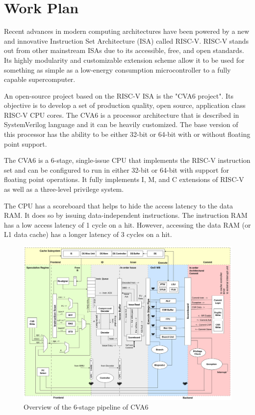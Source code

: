 \chapter{Work Plan}
\label{chapter:work_plan}

Recent advances in modern computing architectures have been powered by a new and innovative Instruction Set Architecture (ISA) called RISC-V. RISC-V stands out from other mainstream ISAs due to its accessible, free, and open standards. Its highly modularity and customizable extension scheme allow it to be used for something as simple as a low-energy consumption microcontroller to a fully capable supercomputer.

An open-source project based on the RISC-V ISA is the "CVA6 project". Its objective is to develop a set of production quality, open source, application class RISC-V CPU cores. The CVA6 is a processor architecture that is described in SystemVerilog language and it can be heavily customized. The base version of this processor has the ability to be either 32-bit or 64-bit with or without floating point support.

The CVA6 is a 6-stage, single-issue CPU that implements the RISC-V instruction set and can be configured to run in either 32-bit or 64-bit with support for floating point operations. It fully implements I, M, and C extensions of RISC-V as well as a three-level privilege system.

The CPU has a scoreboard that helps to hide the access latency to the data RAM. It does so by issuing data-independent instructions. The instruction RAM has a low access latency of 1 cycle on a hit. However, accessing the data RAM (or L1 data cache) has a longer latency of 3 cycles on a hit.


\begin{figure}[H]
	\begin{center}
 		\includegraphics[width=0.7\linewidth]{images/cva6_overview.png}
 		\caption{Overview of the 6-stage pipeline of CVA6}
 		\label{fig:cva6-overview}
	\end{center} 
\end{figure}


